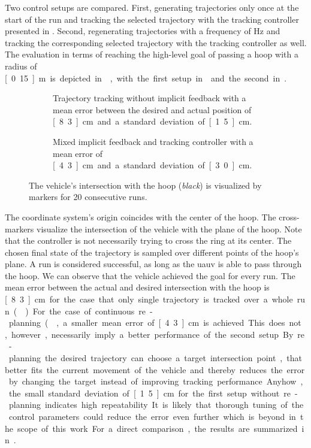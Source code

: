 Two control setups are compared. First, generating trajectories only once at the start of the run and tracking the selected trajectory with the tracking controller presented in . Second, regenerating trajectories with a frequency of \unit[2]{Hz} and tracking the corresponding selected trajectory with the tracking controller as well. The evaluation in terms of reaching the high-level goal of passing a hoop with a radius of \unit[0.15]{m} is depicted in , with the first setup in  and the second in .
\begin{figure}
	\centering
 \begin{subfigure}[t]{0.49\textwidth}
		\centering
		
     \caption{Trajectory tracking without implicit feedback with a mean error between the desired and actual position of \unit[8.3]{cm} and a standard deviation of \unit[1.5]{cm}.}
     \label{fig:hoop-experiment-without-replanning}
 \end{subfigure}
    \begin{subfigure}[t]{0.49\textwidth}
		\centering
		
        \caption{Mixed implicit feedback and tracking controller with a mean error of \unit[4.3]{cm} and a standard deviation of \unit[3.0]{cm}.}
        \label{fig:hoop-experiment-with-replanning}
    \end{subfigure}
    \caption{The vehicle's intersection with the hoop (\emph{black}) is visualized by markers for 20 consecutive runs. }
    \label{fig:hoop-experiment}
\end{figure}
The coordinate system's origin coincides with the center of the hoop. The cross-markers visualize the intersection of the vehicle with the plane of the hoop. Note that the controller is not necessarily trying to cross the ring at its center. The chosen final state of the trajectory is sampled over different points of the hoop's plane. A run is considered successful, as long as the \ac{uauv} is able to pass through the hoop. We can observe that the vehicle achieved the goal for every run.
The mean error between the actual and desired intersection with the hoop is \unit[8.3]{cm} for the case that only single trajectory is tracked over a whole run ().
For the case of continuous re-planning (, a smaller mean error of \unit[4.3]{cm} is achieved. 
This does not, however, necessarily imply a better performance of the second setup. By re-planning the desired trajectory can choose a target intersection point, that better fits the current movement of the vehicle and thereby reduces the error by changing the target instead of improving tracking performance. 
Anyhow, the small standard deviation of \unit[1.5]{cm} for the first setup without re-planning indicates high repeatability. It is likely that thorough tuning of the control parameters could reduce the error even further which is beyond in the scope of this work. For a direct comparison, the results are summarized in .

